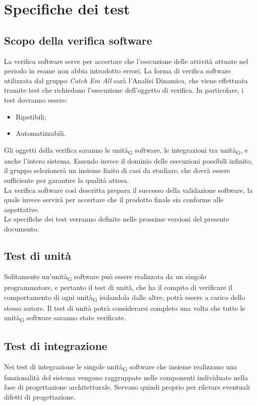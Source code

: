 \section{Specifiche dei test}

\subsection{Scopo della verifica software}
La verifica software serve per accertare che l'esecuzione delle attività attuate nel periodo in esame non abbia introdotto errori. La forma di verifica software utilizzata dal gruppo \textit{Catch Em All} sarà l'Analisi Dinamica, che viene effettuata tramite test che richiedono l'esecuzione dell'oggetto di verifica. In particolare, i test dovranno essere:
\begin{itemize}
	\item Ripetibili;
	\item Automatizzabili.
\end{itemize}
Gli oggetti della verifica saranno le unità\textsubscript{G} software, le integrazioni tra unità\textsubscript{G}, e anche l'intero sistema. Essendo invece il dominio delle esecuzioni possibili infinito, il gruppo selezionerà un insieme finito di casi da studiare, che dovrà essere sufficiente per garantire la qualità attesa.\\
La verifica software così descritta prepara il successo della validazione software, la quale invece servirà per accertare che il prodotto finale sia conforme alle aspettative.\\
Le specifiche dei test verranno definite nelle prossime versioni del presente documento.
\subsection{Test di unità}
Solitamente un'unità\textsubscript{G} software può essere realizzata da un singolo programmatore, e pertanto il test di unità, che ha il compito di verificare il comportamento di ogni unità\textsubscript{G} isolandola dalle altre, potrà essere a carico dello stesso autore. Il test di unità potrà considerarsi completo una volta che tutte le unità\textsubscript{G} software saranno state verificate.

\subsection{Test di integrazione}
Nei test di integrazione le singole unità\textsubscript{G} software che insieme realizzano una funzionalità del sistema vengono raggruppate nelle componenti individuate nella fase di progettazione architetturale. Servono quindi proprio per rilevare eventuali difetti di progettazione.

